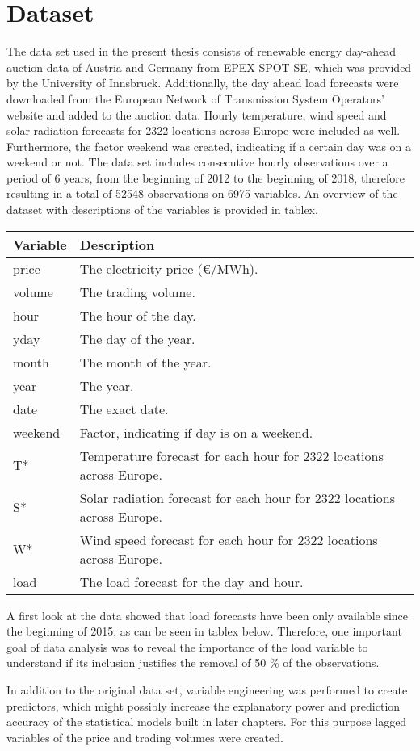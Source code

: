\chapter{Dataset}
The data set used in the present thesis consists of renewable energy day-ahead auction data of Austria and Germany from EPEX SPOT SE, which was provided by the University of Innsbruck. Additionally, the day ahead load forecasts were downloaded from the European Network of Transmission System Operators' website and added to the auction data. Hourly temperature, wind speed and solar radiation forecasts for 2322 locations across Europe were included as well. Furthermore, the factor weekend was created, indicating if a certain day was on a weekend or not. The data set includes consecutive hourly observations over a period of 6 years, from the beginning of 2012 to the beginning of 2018, therefore resulting in a total of 52548 observations on 6975 variables. An overview of the dataset with descriptions of the variables is provided in tablex. 

\begin{tabular}{ll}
    Variable & Description \\
    \hline
    price   &   The electricity price (\euro/MWh). \\
    volume  &   The trading volume. \\
    hour    &   The hour of the day. \\
    yday    &   The day of the year. \\
    month   &   The month of the year. \\
    year    &   The year. \\
    date    &   The exact date. \\
    weekend &   Factor, indicating if day is on a weekend. \\
    T*      &   Temperature forecast for each hour for 2322 locations across Europe. \\
    S*      &   Solar radiation forecast for each hour for 2322 locations across Europe. \\
    W*      &   Wind speed forecast for each hour for 2322 locations across Europe. \\
    load    &  The load forecast for the day and hour. \\
\end{tabular}

A first look at the data showed that load forecasts have been only available since the beginning of 2015, as can be seen in tablex below. Therefore, one important goal of data analysis was to reveal the importance of the load variable to understand if its inclusion justifies the removal of 50 \% of the observations. 

In addition to the original data set, variable engineering was performed to create predictors, which might possibly increase the explanatory power and prediction accuracy of the statistical models built in later chapters. For this purpose lagged variables of the price and trading volumes were created.